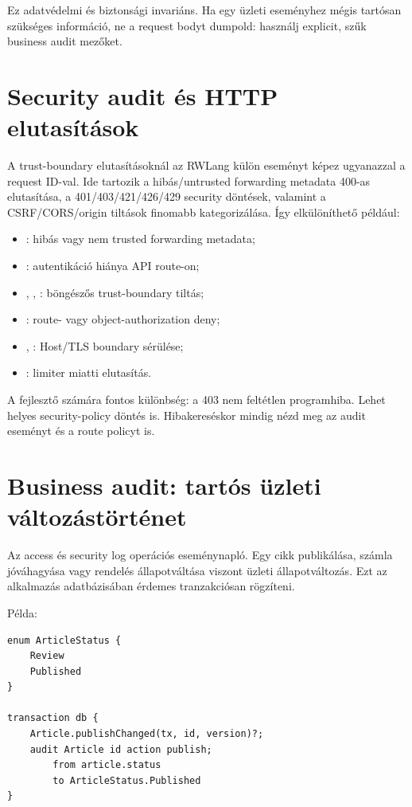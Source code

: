 Ez adatvédelmi és biztonsági invariáns. Ha egy üzleti eseményhez mégis tartósan szükséges információ, ne a request bodyt dumpold: használj explicit, szűk business audit mezőket.

\section{Security audit és HTTP elutasítások}

A trust-boundary elutasításoknál az RWLang külön  eseményt képez ugyanazzal a request ID-val. Ide tartozik a hibás/untrusted forwarding metadata 400-as elutasítása, a 401/403/421/426/429 security döntések, valamint a CSRF/CORS/origin tiltások finomabb kategorizálása. Így elkülöníthető például:

\begin{itemize}
  \item {}: hibás vagy nem trusted forwarding metadata;
  \item {}: autentikáció hiánya API route-on;
  \item {}, , : böngészős trust-boundary tiltás;
  \item {}: route- vagy object-authorization deny;
  \item {}, : Host/TLS boundary sérülése;
  \item {}: limiter miatti elutasítás.
\end{itemize}

A fejlesztő számára fontos különbség: a 403 nem feltétlen programhiba. Lehet helyes security-policy döntés is. Hibakereséskor mindig nézd meg az audit eseményt és a route policyt is.

\section{Business audit: tartós üzleti változástörténet}

Az access és security log operációs eseménynapló. Egy cikk publikálása, számla jóváhagyása vagy rendelés állapotváltása viszont üzleti állapotváltozás. Ezt az alkalmazás adatbázisában érdemes tranzakciósan rögzíteni.

Példa:

\begin{lstlisting}[language=RWLang]
enum ArticleStatus {
    Review
    Published
}

transaction db {
    Article.publishChanged(tx, id, version)?;
    audit Article id action publish;
        from article.status
        to ArticleStatus.Published
}
\end{lstlisting}

